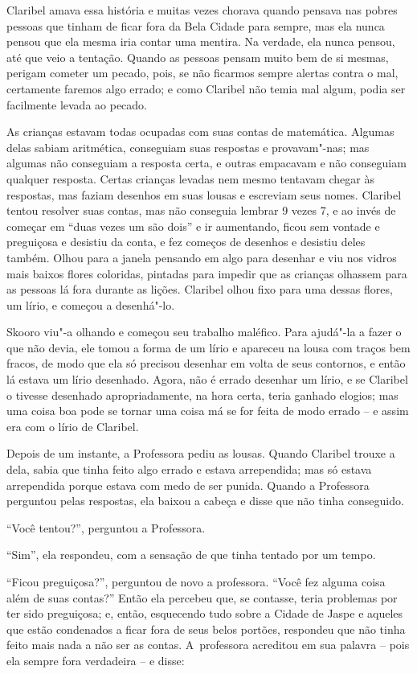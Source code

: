 Claribel amava essa história e muitas vezes chorava quando pensava nas
pobres pessoas que tinham de ficar fora da Bela Cidade para sempre, mas
ela nunca pensou que ela mesma iria contar uma mentira. Na verdade, ela
nunca pensou, até que veio a tentação. Quando as pessoas pensam muito
bem de si mesmas, perigam cometer um pecado, pois, se não ficarmos
sempre alertas contra o mal, certamente faremos algo errado; e como
Claribel não temia mal algum, podia ser facilmente levada ao pecado.

As crianças estavam todas ocupadas com suas contas de matemática.
Algumas delas sabiam aritmética, conseguiam suas respostas e
provavam"-nas; mas algumas não conseguiam a resposta certa, e outras
empacavam e não conseguiam qualquer resposta. Certas crianças levadas
nem mesmo tentavam chegar às respostas, mas faziam desenhos em suas
lousas e escreviam seus nomes. Claribel tentou resolver suas contas, mas
não conseguia lembrar 9 vezes 7, e ao invés de começar em ``duas vezes
um são dois'' e ir aumentando, ficou sem vontade e preguiçosa e desistiu
da conta, e fez começos de desenhos e desistiu deles também. Olhou para
a janela pensando em algo para desenhar e viu nos vidros mais baixos
flores coloridas, pintadas para impedir que as crianças olhassem para as
pessoas lá fora durante as lições. Claribel olhou fixo para uma dessas
flores, um lírio, e começou a desenhá"-lo.

Skooro viu"-a olhando e começou seu trabalho maléfico. Para ajudá"-la a
fazer o que não devia, ele tomou a forma de um lírio e apareceu na lousa
com traços bem fracos, de modo que ela só precisou desenhar em volta de
seus contornos, e então lá estava um lírio desenhado. Agora, não é
errado desenhar um lírio, e se Claribel o tivesse desenhado
apropriadamente, na hora certa, teria ganhado elogios; mas uma coisa boa
pode se tornar uma coisa má se for feita de modo errado -- e assim era
com o lírio de Claribel.

Depois de um instante, a Professora pediu as lousas. Quando Claribel
trouxe a dela, sabia que tinha feito algo errado e estava arrependida;
mas só estava arrependida porque estava com medo de ser punida. Quando a
Professora perguntou pelas respostas, ela baixou a cabeça e disse que
não tinha conseguido.

``Você tentou?'', perguntou a Professora.

``Sim'', ela respondeu, com a sensação de que tinha tentado por um
tempo.

``Ficou preguiçosa?'', perguntou de novo a professora. ``Você fez alguma
coisa além de suas contas?'' Então ela percebeu que, se contasse, teria
problemas por ter sido preguiçosa; e, então, esquecendo tudo sobre a
Cidade de Jaspe e aqueles que estão condenados a ficar fora de seus
belos portões, respondeu que não tinha feito mais nada a não ser as
contas. A~professora acreditou em sua palavra -- pois ela sempre fora
verdadeira -- e disse:

